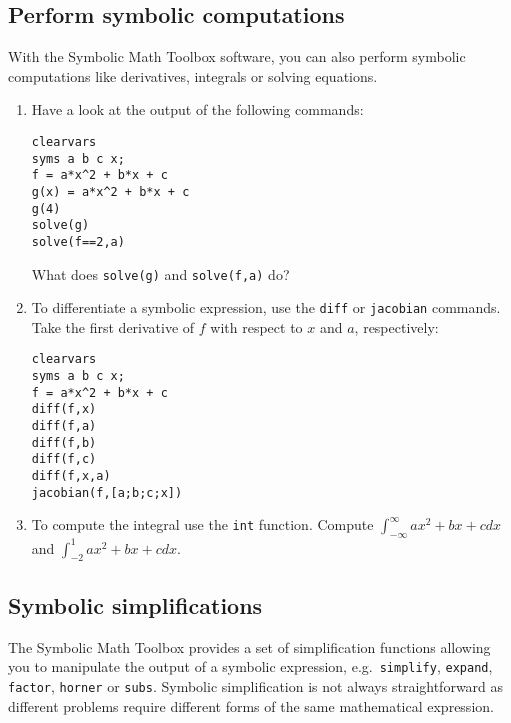 \subsection*{Perform symbolic computations}
With the Symbolic Math Toolbox software, you can also perform symbolic computations like derivatives, integrals or solving equations.

\begin{enumerate}[resume]

\item
Have a look at the output of the following commands:
\begin{lstlisting}[style=Matlab-editor,basicstyle=\mlttfamily\scriptsize]
clearvars
syms a b c x;
f = a*x^2 + b*x + c
g(x) = a*x^2 + b*x + c
g(4)
solve(g)
solve(f==2,a)
\end{lstlisting}
What does \texttt{solve{(g)}} and \texttt{solve{(f,a)}} do?

\item
To differentiate a symbolic expression, use the \texttt{diff} or \texttt{jacobian} commands.
Take the first derivative of \(f\) with respect to \(x\) and \(a\), respectively:
\begin{lstlisting}[style=Matlab-editor,basicstyle=\mlttfamily\scriptsize]
clearvars
syms a b c x;
f = a*x^2 + b*x + c
diff(f,x)
diff(f,a)
diff(f,b)
diff(f,c)
diff(f,x,a)
jacobian(f,[a;b;c;x])
\end{lstlisting}

\item
To compute the integral use the \texttt{int} function.
Compute \(\int_{-\infty}^\infty a x^2 + b x + c dx\) and \(\int_{-2}^1 a x^2 + b x + c dx\).

\end{enumerate}

\subsection*{Symbolic simplifications}
The Symbolic Math Toolbox provides a set of simplification functions
  allowing you to manipulate the output of a symbolic expression, e.g.\
  \texttt{simplify}, \texttt{expand}, \texttt{factor}, \texttt{horner} or \texttt{subs}.
Symbolic simplification is not always straightforward
  as different problems require different forms of the same mathematical expression.

